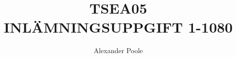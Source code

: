 
\usepackage[utf8]{inputenc}
\usepackage[T1]{fontenc}
\usepackage{ae,aecompl}
\usepackage{listings}
\usepackage{graphicx}
\usepackage{mathtools}
\usepackage{latexsym}
\usepackage{graphicx}

\setlength{\parindent}{0pt}
\setlength{\parskip}{1ex plus 0.5ex minus 0.2ex}

\newcommand{\twodigit}[1]{\ifthenelse{#1<10}{0}{}{#1}}
\newcommand{\dagensdatum}{
\number\year-\twodigit{\number\month}-\twodigit{\number\day}}

\usepackage{fancyhdr}
\pagestyle{fancy}
\cfoot{{\ } \\ \thepage}

\title{TSEA05 \\ INLÄMNINGSUPPGIFT 1-1080}
\author{Alexander Poole}

\usepackage{mdframed}


